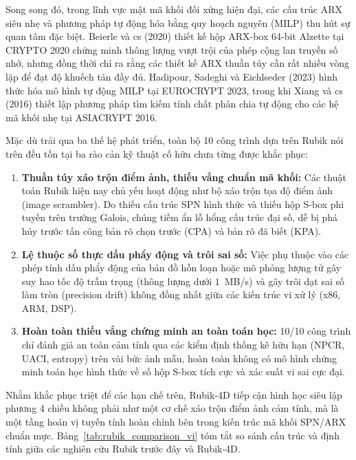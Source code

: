 \documentclass[10pt,twocolumn]{article}
\begin{document}
Song song đó, trong lĩnh vực mật mã khối đối xứng hiện đại, các cấu trúc ARX siêu nhẹ và phương pháp tự động hóa bằng quy hoạch nguyên (MILP) thu hút sự quan tâm đặc biệt. Beierle và cs (2020) \cite{beierle2020alzette} thiết kế hộp ARX-box 64-bit Alzette tại CRYPTO 2020 chứng minh thông lượng vượt trội của phép cộng lan truyền số nhớ, nhưng đồng thời chỉ ra rằng các thiết kế ARX thuần túy cần rất nhiều vòng lặp để đạt độ khuếch tán đầy đủ. Hadipour, Sadeghi và Eichlseder (2023) \cite{hadipour2023impossible} hình thức hóa mô hình tự động MILP tại EUROCRYPT 2023, trong khi Xiang và cs (2016) \cite{xiang2016milp} thiết lập phương pháp tìm kiếm tính chất phân chia tự động cho các hệ mã khối nhẹ tại ASIACRYPT 2016.

Mặc dù trải qua ba thế hệ phát triển, toàn bộ 10 công trình dựa trên Rubik nói trên đều tồn tại ba rào cản kỹ thuật cố hữu chưa từng được khắc phục:
\begin{enumerate}
    \item \textbf{Thuần túy xáo trộn điểm ảnh, thiếu vắng chuẩn mã khối:} Các thuật toán Rubik hiện nay chủ yếu hoạt động như bộ xáo trộn tọa độ điểm ảnh (image scrambler). Do thiếu cấu trúc SPN hình thức và thiếu hộp S-box phi tuyến trên trường Galois, chúng tiềm ẩn lỗ hổng cấu trúc đại số, dễ bị phá hủy trước tấn công bản rõ chọn trước (CPA) và bản rõ đã biết (KPA).
    \item \textbf{Lệ thuộc số thực dấu phẩy động và trôi sai số:} Việc phụ thuộc vào các phép tính dấu phẩy động của bản đồ hỗn loạn hoặc mô phỏng lượng tử gây suy hao tốc độ trầm trọng (thông lượng dưới $1$~MB/s) và gây trôi dạt sai số làm tròn (precision drift) không đồng nhất giữa các kiến trúc vi xử lý (x86, ARM, DSP).
    \item \textbf{Hoàn toàn thiếu vắng chứng minh an toàn toán học:} 10/10 công trình chỉ đánh giá an toàn cảm tính qua các kiểm định thống kê hữu hạn (NPCR, UACI, entropy) trên vài bức ảnh mẫu, hoàn toàn không có mô hình chứng minh toán học hình thức về số hộp S-box tích cực và xác suất vi sai cực đại.
\end{enumerate}

Nhằm khắc phục triệt để các hạn chế trên, Rubik-4D tiếp cận hình học siêu lập phương 4 chiều không phải như một cơ chế xáo trộn điểm ảnh cảm tính, mà là một tầng hoán vị tuyến tính hoàn chỉnh bên trong kiến trúc mã khối SPN/ARX chuẩn mực. Bảng~\ref{tab:rubik_comparison_vi} tóm tắt so sánh cấu trúc và định tính giữa các nghiên cứu Rubik trước đây và Rubik-4D.
\end{document}

